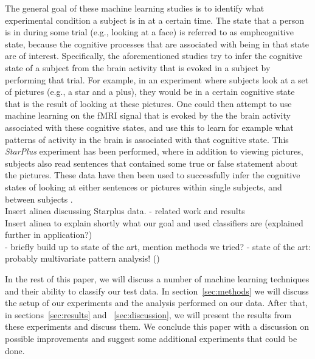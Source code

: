 \documentclass[preprint,journal]{vgtc}
\begin{document}
\indent  The general goal of these machine learning studies is to identify what experimental condition a subject is in at a certain time. The state that a person is in during some trial (e.g., looking at a face) is referred to as emph{cognitive state}, because the cognitive processes that are associated with being in that state are of interest. Specifically, the aforementioned studies try to infer the cognitive state of a subject from the brain activity that is evoked in a subject by performing that trial. For example, in an experiment where subjects look at a set of pictures (e.g., a star and a plus), they would be in a certain cognitive state that is the result of looking at these pictures. One could then attempt to use machine learning on the fMRI signal that is evoked by the the brain activity associated with these cognitive states, and use this to learn for example what patterns of activity in the brain is associated with that cognitive state. This \emph{StarPlus} experiment has been performed, where in addition to viewing pictures, subjects also read sentences that contained some true or false statement about the pictures. These data have then been used to successfully infer the cognitive states of looking at either sentences or pictures within single subjects\cite{mi:2003within}, and between subjects \cite{wa:2003betw}. \\Insert alinea discussing Starplus data. - related work and results\\
\indent Insert alinea to explain shortly what our goal and used classifiers are (explained further in application?)\\



- briefly build up to state of the art, mention methods we tried?
- state of the art: probably multivariate pattern analysis! (\cite{Haxby2012852})

In the rest of this paper, we will discuss a number of machine learning techniques and their ability to classify our test data. In section~\ref{sec:methods} we will discuss the setup of our experiments and the analysis performed on our data. After that, in sections~\ref{sec:results} and ~\ref{sec:discussion}, we will present the results from these experiments and discuss them. We conclude this paper with a discussion on possible improvements and suggest some additional experiments that could be done.
\end{document}
